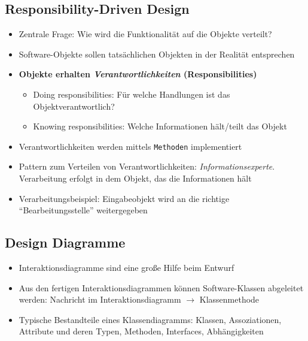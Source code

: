 \subsection{Responsibility-Driven Design}
\begin{itemize}
	\item Zentrale Frage: Wie wird die Funktionalität auf die Objekte verteilt?
	\item Software-Objekte sollen tatsächlichen Objekten in der Realität entsprechen
	\item \textbf{Objekte erhalten \textit{Verantwortlichkeiten} (Responsibilities)}
	\begin{itemize}
		\item Doing responsibilities: Für welche Handlungen ist das Objektverantwortlich?
		\item Knowing responsibilities: Welche Informationen hält/teilt das Objekt
	\end{itemize}
	\item Verantwortlichkeiten werden mittels \texttt{Methoden} implementiert
	\item Pattern zum Verteilen von Verantwortlichkeiten: \textit{Informationsexperte}. Verarbeitung erfolgt in dem Objekt, das die Informationen hält
	\item Verarbeitungsbeispiel: Eingabeobjekt wird an die richtige "`Bearbeitungsstelle"' weitergegeben
\end{itemize}


\subsection{Design Diagramme}
\begin{itemize}
	\item Interaktionsdiagramme sind eine große Hilfe beim Entwurf
	\item Aus den fertigen Interaktionsdiagrammen können Software-Klassen abgeleitet werden: Nachricht im Interaktionsdiagramm \(\rightarrow\) Klassenmethode
	\item Typische Bestandteile eines Klassendiagramms: Klassen, Assoziationen, Attribute und deren Typen, Methoden, Interfaces, Abhängigkeiten
\end{itemize}


